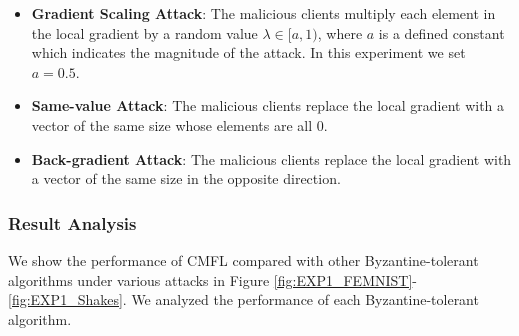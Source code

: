 \documentclass[10pt,journal,compsoc]{IEEEtran}
\begin{document}
\begin{itemize}
	\item \textbf{Gradient Scaling Attack}: The malicious clients multiply each element in the local gradient by a random value $\lambda\in [a, 1)$, where $a$ is a defined constant which indicates the magnitude of the attack. In this experiment we set $a=0.5$. 
	\item \textbf{Same-value Attack}\cite{DBLP:conf/aaai/LiXCGL19}: The malicious clients replace the local gradient with a vector of the same size whose elements are all 0.
	\item \textbf{Back-gradient Attack}\cite{10.1145/3128572.3140451}: The malicious clients replace the local gradient with a vector of the same size in the opposite direction.
\end{itemize}

\subsubsection{Result Analysis}

We show the performance of CMFL compared with other Byzantine-tolerant algorithms under various attacks in Figure \ref{fig:EXP1_FEMNIST}-\ref{fig:EXP1_Shakes}. We analyzed the performance of each Byzantine-tolerant algorithm.
\end{document}
